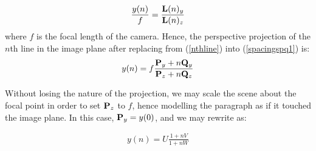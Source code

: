 \begin{eqnarray}
\frac{y(n)}{f}  = \frac{ { \bf L }(n)_y }{ { \bf L }(n)_z }  \label{spacingspq1}
\end{eqnarray}
{\parindent 0mm
where $f$ is the focal length of the camera. Hence, the perspective projection
of the  $n$th line in the image plane after replacing from (\ref{nthline}) into
(\ref{spacingspq1}) is: 
}
\begin{eqnarray}
y(n) =  f \frac{ { \bf P }_y + n { \bf Q }_y }{ { \bf P }_z + n{ \bf Q }_z } \label{spacingspq}
\end{eqnarray}

{\parindent 0mm
Without losing the nature of the projection, we may scale the scene about the focal point in order to set ${ \bf P }_z$ to $f$, hence modelling the paragraph as if it touched the image plane.  In this case, ${ \bf P }_y=y(0)$,
and we may rewrite  as:
}

\begin{eqnarray}
y(n) = U \frac{ 1 + nV }{ 1 + nW } \label{spacingsvweqn}
\end{eqnarray}


